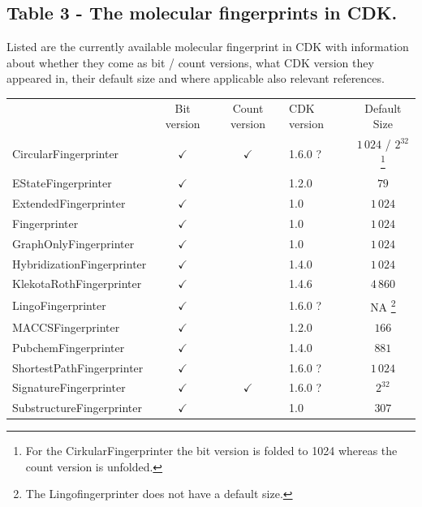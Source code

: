 \documentclass[10pt]{bmcart}
\begin{document}
\begin{backmatter}
  \subsection*{Table 3 - The molecular fingerprints in CDK.}
  \label{tab:fingerprints}
  Listed are the currently available molecular fingerprint in CDK with
  information about whether they come as bit / count versions, what CDK version
  they appeared in, their default size and where applicable also relevant
  references.
  \baselineskip

    \begin{minipage}{1\textwidth}
    \renewcommand*{\thempfootnote}{\fnsymbol{mpfootnote}}
    \centering
    \begin{tabular}{lcclc}
                             & Bit version  & Count version & CDK version & Default Size    \\
  CircularFingerprinter~\cite{rogers2010extended, Clark2014}      & $\checkmark$ & $\checkmark$  & 1.6.0 ?     & $1\,024$ / $2^{32}$%
\footnote[1]{For the CirkularFingerprinter the bit version is folded to 1024 whereas the count version is unfolded.} \\
  EStateFingerprinter~\cite{Hall1995}       & $\checkmark$ &               & 1.2.0       & $79$            \\
  ExtendedFingerprinter      & $\checkmark$ &               & 1.0         & $1\,024$        \\
  Fingerprinter              & $\checkmark$ &               & 1.0         & $1\,024$        \\
  GraphOnlyFingerprinter     & $\checkmark$ &               & 1.0         & $1\,024$        \\
  HybridizationFingerprinter & $\checkmark$ &               & 1.4.0       & $1\,024$        \\
  KlekotaRothFingerprinter~\cite{Klekota2008}   & $\checkmark$ &               & 1.4.6       & $4\,860$        \\
  LingoFingerprinter~\cite{vidal2005lingo}         & $\checkmark$ &               & 1.6.0 ?     & NA%
\footnote[2]{The Lingofingerprinter does not have a default size.}
                                                                                             \\
  MACCSFingerprinter         & $\checkmark$ &               & 1.2.0       & $166$           \\
  PubchemFingerprinter~\cite{pubchemFP}       & $\checkmark$ &               & 1.4.0       & $881$            \\
  ShortestPathFingerprinter  & $\checkmark$ &               & 1.6.0 ?     & $1\,024$        \\
  SignatureFingerprinter~\cite{signaturefingerprints}     & $\checkmark$ & $\checkmark$  & 1.6.0 ?     & $2^{32}$         \\
  SubstructureFingerprinter  & $\checkmark$ &               & 1.0         & $307$           \\


\end{tabular}
\end{minipage}
\end{backmatter}
\end{document}
